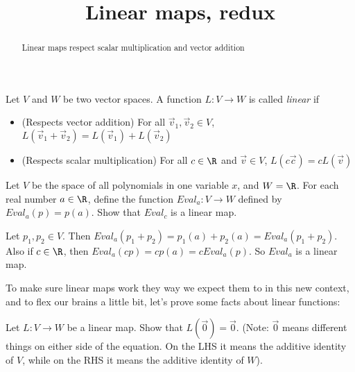 \documentclass{ximera}
\title{Linear maps, redux}
\begin{document}
\begin{abstract}
	Linear maps respect scalar multiplication and vector addition
\end{abstract}

\begin{definition}
	Let $V$ and $W$ be two vector spaces.  A function $L: V \to W$ is called \textit{linear} if 
	\begin{itemize}
		\item (Respects vector addition) For all $\vec{v}_1,\vec{v}_2 \in V$, $L(\vec{v}_1+\vec{v}_2) = L(\vec{v}_1)+L(\vec{v}_2)$
		\item (Respects scalar multiplication) For all $c \in \R$ and $\vec{v} \in V$, $L(c\vec{c}) = cL(\vec{v})$
	\end{itemize}
\end{definition}

	Let $V$ be the space of all polynomials in one variable $x$, and $W = \R$.  For each real number $a \in \R$, define the function
	$Eval_a: V \to W$ defined by $Eval_a(p) = p(a)$.  Show that $Eval_c$ is a linear map. 

\begin{free-response}	
	 Let $p_1, p_2 \in V$.  Then $Eval_a(p_1+p_2)  = p_1(a)+p_2(a) = Eval_a(p_1+p_2)$.  Also if $c \in \R$, then $Eval_a(cp) = cp(a) = cEval_a(p)$.  So $Eval_a$
	 is a linear map.
\end{free-response}




To make sure linear maps work they way we expect them to in this new context, and to flex our brains a little bit, let's prove some facts about linear functions:

	Let $L:V \to W$ be a linear map.  Show that $L(\vec{0}) = \vec{0}$. 
	(Note: $\vec{0}$ means different things on either side of the equation.  On the LHS it means the additive identity of $V$, while on the RHS it means the 
	additive identity of $W$).
\end{document}
